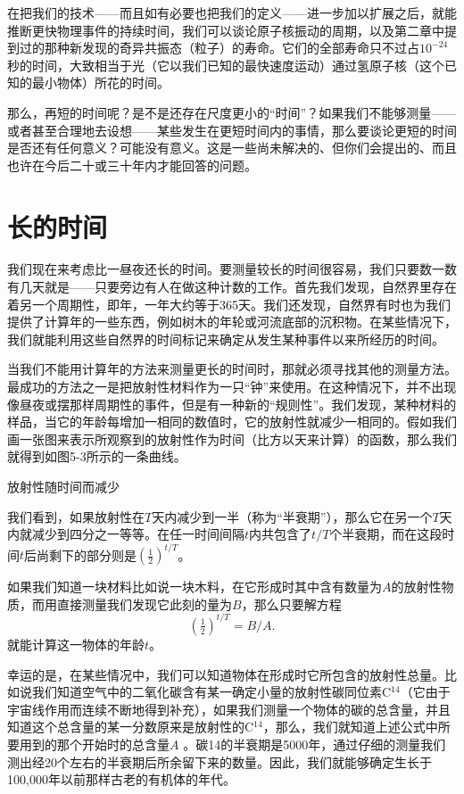 \documentclass[12pt,oneside]{book}
\begin{document}
在把我们的技术——而且如有必要也把我们的定义——进一步加以扩展之后，就能推断更快物理事件的持续时间，我们可以谈论原子核振动的周期，以及第二章中提到过的那种新发现的奇异共振态（粒子）的寿命。它们的全部寿命只不过占$ 10^{-24} $秒的时间，大致相当于光（它以我们已知的最快速度运动）通过氢原子核（这个已知的最小物体）所花的时间。

那么，再短的时间呢？是不是还存在尺度更小的“时间”？如果我们不能够测量——或者甚至合理地去设想——某些发生在更短时间内的事情，那么要谈论更短的时间是否还有任何意义？可能没有意义。这是一些尚未解决的、但你们会提出的、而且也许在今后二十或三十年内才能回答的问题。


\section{长的时间}
我们现在来考虑比一昼夜还长的时间。要测量较长的时间很容易，我们只要数一数有几天就是——只要旁边有人在做这种计数的工作。首先我们发现，自然界里存在着另一个周期性，即年，一年大约等于365天。我们还发现，自然界有时也为我们提供了计算年的一些东西，例如树木的年轮或河流底部的沉积物。在某些情况下，我们就能利用这些自然界的时间标记来确定从发生某种事件以来所经历的时间。

当我们不能用计算年的方法来测量更长的时间时，那就必须寻找其他的测量方法。最成功的方法之一是把放射性材料作为一只“钟”来使用。在这种情况下，并不出现像昼夜或摆那样周期性的事件，但是有一种新的“规则性”。我们发现，某种材料的样品，当它的年龄每增加一相同的数值时，它的放射性就减少一相同的。假如我们画一张图来表示所观察到的放射性作为时间（比方以天来计算）的函数，那么我们就得到如图5-3所示的一条曲线。
\begin{fig}{放射性随时间而减少}
\caption{\footnotesize 放射性随时间而减少。在每一个“半衰期”$ T $中，放射性都减少一半}
\label{fig:放射性随时间而减少}
\end{fig}
我们看到，如果放射性在$ T $天内减少到一半（称为“半衰期”），那么它在另一个$ T $天内就减少到四分之一等等。在任一时间间隔$ t $内共包含了$ t/T $个半衰期，而在这段时间$ t $后尚剩下的部分则是$ (\tfrac{1}{2})^{t/T} $。

如果我们知道一块材料比如说一块木料，在它形成时其中含有数量为$ A $的放射性物质，而用直接测量我们发现它此刻的量为$ B $，那么只要解方程
\begin{equation*}
(\tfrac{1}{2})^{t/T}=B/A.
\end{equation*}
就能计算这一物体的年龄$ t $。

幸运的是，在某些情况中，我们可以知道物体在形成时它所包含的放射性总量。比如说我们知道空气中的二氧化碳含有某一确定小量的放射性碳同位素C$ ^{14} $（它由于宇宙线作用而连续不断地得到补充），如果我们测量一个物体的碳的总含量，并且知道这个总含量的某一分数原来是放射性的C$ ^{14} $，那么，我们就知道上述公式中所要用到的那个开始时的总含量$ A $ 。碳14的半衰期是5000年，通过仔细的测量我们测出经20个左右的半衰期后所余留下来的数量。因此，我们就能够确定生长于100,000年以前那样古老的有机体的年代。
\end{document}
